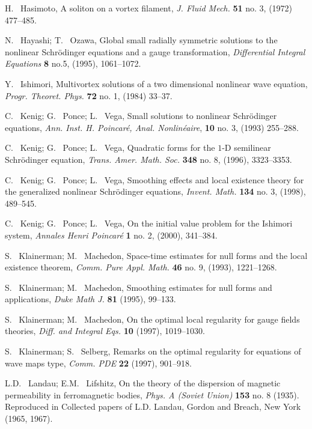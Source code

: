 \documentclass[draft,11pt,leqno]{amsart}
\begin{document}
\begin{thebibliography}{100}
 H. ~Hasimoto, A soliton on a vortex filament, {\em 
J. Fluid Mech.} {\bf 51} no. 3, (1972) 477--485. 

 N. ~Hayashi; T. ~Ozawa, Global small radially symmetric solutions to the nonlinear Schr\"odinger equations and a gauge transformation, {\em Differential Integral Equations} {\bf 8} no.5, (1995), 1061--1072. 

 Y. ~Ishimori, Multivortex solutions of a two dimensional nonlinear wave equation, {\em Progr. Theoret. Phys.} {\bf 72} no. 1, (1984) 33--37.


 C. ~Kenig; G. ~Ponce; L. ~Vega, Small solutions to nonlinear Schr\"odinger equations, {\em Ann. Inst. H. Poincar\'e, Anal. Nonlin\'eaire}, {\bf 10} no. 3, (1993) 255--288. 

 C. ~Kenig; G. ~Ponce; L. ~Vega,  Quadratic forms for the $1$-D semilinear Schr\"odinger equation, {\em Trans. Amer. Math. Soc.} {\bf 348} no. 8, (1996), 3323--3353. 


 C. ~Kenig; G. ~Ponce; L. ~Vega, Smoothing effects and local existence theory for the generalized nonlinear Schr\"odinger equations, {\em Invent. Math.} {\bf 134} no. 3, (1998), 489--545.

 C. ~Kenig; G. ~Ponce; L. ~Vega, On the initial value problem for the Ishimori system, {\em Annales Henri Poincar\'e} {\bf 1} no. 2, (2000), 341--384.

  S. ~Klainerman; M. ~Machedon, Space-time estimates for null forms and the local existence theorem, {\em Comm. Pure Appl. Math.} {\bf 46} no. 9, (1993), 1221--1268. 

  S. ~Klainerman; M. ~Machedon, Smoothing estimates for null forms and applications, {\em Duke Math J.} {\bf 81} (1995), 99--133.

 S. ~Klainerman; M. ~Machedon, On the optimal local regularity for gauge fields theories, {\em  Diff. and Integral Eqs.} {\bf 10} (1997), 1019--1030.   

 S. ~Klainerman; S. ~Selberg, Remarks on the optimal regularity for equations of wave maps type, {\em  Comm. PDE} {\bf 22} (1997),  901--918. 

 L.D. ~Landau; E.M. ~Lifshitz, On the theory of the
  dispersion of magnetic permeability in ferromagnetic bodies, {\em
    Phys. A (Soviet Union) } {\bf 153} no. 8 (1935). Reproduced in Collected
  papers of L.D. Landau, Gordon and Breach, New York (1965, 1967). 


\end{thebibliography}
\end{document}
